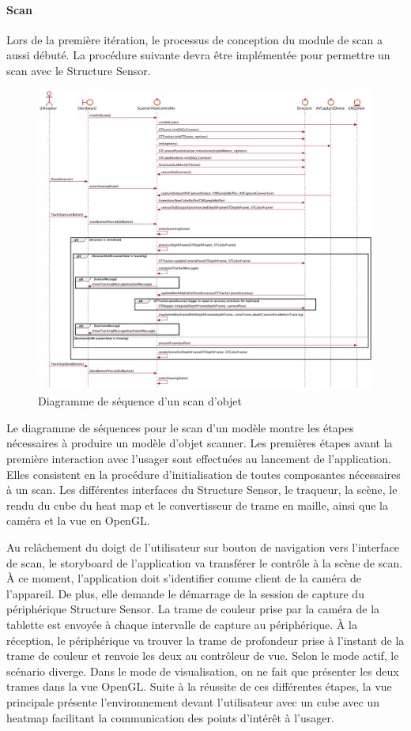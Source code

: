 \documentclass[rapport.tex]{subfiles}
\begin{document}
\paragraph*{Scan}
Lors de la première itération, le processus de conception du module de scan a aussi débuté. La procédure suivante devra être implémentée pour permettre un scan avec le Structure Sensor.
\begin{figure}[H]
    \includegraphics[width=\textwidth]{diagrams/dss-scanner.png}
\centering
    \caption{Diagramme de séquence d'un scan d'objet}
\end{figure}
Le diagramme de séquences pour le scan d’un modèle montre les étapes nécessaires à produire un modèle d’objet scanner. Les premières étapes avant la première interaction avec l’usager sont effectuées au lancement de l’application. Elles consistent en la procédure d’initialisation de toutes composantes nécessaires à un scan. Les différentes interfaces du Structure Sensor, le traqueur, la scène, le rendu du cube du heat map et le convertisseur de trame en maille, ainsi que la caméra et la vue en OpenGL.
\par
Au relâchement du doigt de l’utilisateur sur bouton de navigation vers l’interface de scan, le storyboard de l’application va transférer le contrôle à la scène de scan. À ce moment, l’application doit s'identifier comme client de la caméra de l’appareil. De plus, elle demande le démarrage de la session de capture du périphérique Structure Sensor. La trame de couleur prise par la caméra de la tablette est envoyée à chaque intervalle de capture au périphérique. À la réception, le périphérique va trouver la trame de profondeur prise à l’instant de la trame de couleur et renvoie les deux au contrôleur de vue. Selon le mode actif, le scénario diverge. Dans le mode de visualisation, on ne fait que présenter les deux trames dans la vue OpenGL. Suite à la réussite de ces différentes étapes, la vue principale présente l’environnement devant l’utilisateur avec un cube avec un heatmap facilitant la communication des points d’intérêt à l’usager.
\end{document}

